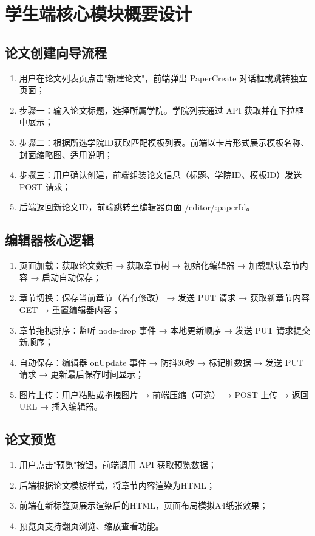 \section{学生端核心模块概要设计}

\subsection{论文创建向导流程}

\begin{enumerate}
    \item 用户在论文列表页点击"新建论文"，前端弹出 PaperCreate 对话框或跳转独立页面；
    \item 步骤一：输入论文标题，选择所属学院。学院列表通过 API 获取并在下拉框中展示；
    \item 步骤二：根据所选学院ID获取匹配模板列表。前端以卡片形式展示模板名称、封面缩略图、适用说明；
    \item 步骤三：用户确认创建，前端组装论文信息（标题、学院ID、模板ID）发送 POST 请求；
    \item 后端返回新论文ID，前端跳转至编辑器页面 /editor/:paperId。
\end{enumerate}

\subsection{编辑器核心逻辑}

\begin{enumerate}
    \item 页面加载：获取论文数据 → 获取章节树 → 初始化编辑器 → 加载默认章节内容 → 启动自动保存；
    \item 章节切换：保存当前章节（若有修改） → 发送 PUT 请求 → 获取新章节内容 GET → 重置编辑器内容；
    \item 章节拖拽排序：监听 node-drop 事件 → 本地更新顺序 → 发送 PUT 请求提交新顺序；
    \item 自动保存：编辑器 onUpdate 事件 → 防抖30秒 → 标记脏数据 → 发送 PUT 请求 → 更新最后保存时间显示；
    \item 图片上传：用户粘贴或拖拽图片 → 前端压缩（可选） → POST 上传 → 返回URL → 插入编辑器。
\end{enumerate}

\subsection{论文预览}

\begin{enumerate}
    \item 用户点击"预览"按钮，前端调用 API 获取预览数据；
    \item 后端根据论文模板样式，将章节内容渲染为HTML；
    \item 前端在新标签页展示渲染后的HTML，页面布局模拟A4纸张效果；
    \item 预览页支持翻页浏览、缩放查看功能。
\end{enumerate}
